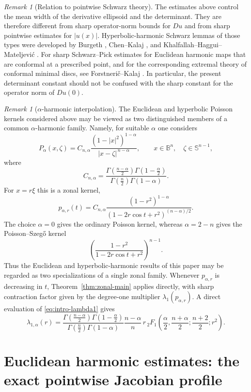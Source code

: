 \documentclass[11pt,reqno]{amsart}
\theoremstyle{remark}
\newtheorem{remark}[theorem]{Remark}
\begin{document}
\begin{remark}[Relation to pointwise Schwarz theory]
The estimates above control the mean width of the derivative ellipsoid
and the determinant. They are therefore different from sharp operator-norm bounds for $Du$ and from sharp pointwise estimates for $|u(x)|$. Hyperbolic-harmonic Schwarz lemmas of those types were developed by Burgeth \cite{Burgeth1992}, Chen--Kalaj \cite{ChenKalaj2021}, and Khalfallah--Haggui--Mateljevi\'c \cite{KhalfallahHagguiMateljevic2022}. For sharp Schwarz--Pick estimates for Euclidean harmonic maps that are conformal at a prescribed point, and for the corresponding extremal theory of conformal minimal discs, see Forstneri\v{c}--Kalaj \cite{ForstnericKalaj2024}. In particular, the present determinant constant should not be confused with the sharp constant for the operator norm of $Du(0)$.
\end{remark}
\begin{remark}[$\alpha$-harmonic interpolation]
The Euclidean and hyperbolic Poisson kernels considered above may be viewed
as two distinguished members of a common $\alpha$-harmonic family.  Namely,
for suitable $\alpha$ one considers
\[
 P_{\alpha}(x,\zeta)
 =
 C_{n,\alpha}
 \frac{(1-|x|^2)^{1-\alpha}}
 {|x-\zeta|^{\,n-\alpha}},
 \qquad
 x\in\mathbb B^n,\quad
 \zeta\in\mathbb S^{n-1},
\]
where
\[
 C_{n,\alpha}
 =
 \frac{
 \Gamma\!\left(\frac{n-\alpha}{2}\right)
 \Gamma\!\left(1-\frac{\alpha}{2}\right)}
 {\Gamma\!\left(\frac n2\right)\Gamma(1-\alpha)}.
\]
For $x=r\xi$ this is a zonal kernel,
\[
 p_{\alpha,r}(t)
 =
 C_{n,\alpha}
 \frac{(1-r^2)^{1-\alpha}}
 {(1-2r\cos t+r^2)^{(n-\alpha)/2}}.
\]
The choice $\alpha=0$ gives the ordinary Poisson kernel,
whereas $\alpha=2-n$ gives the Poisson--Szeg\H{o} kernel
\[
 \left(
 \frac{1-r^2}{1-2r\cos t+r^2}
 \right)^{n-1}.
\]
Thus the Euclidean and hyperbolic-harmonic results of this paper may be
regarded as two specializations of a single zonal family.  Whenever
$p_{\alpha,r}$ is decreasing in $t$, Theorem~\ref{thm:zonal-main} applies
directly, with sharp contraction factor given by the degree-one multiplier
$\lambda_1(p_{\alpha,r})$. A direct evaluation of \eqref{eq:intro-lambda1} gives \[
\lambda_{1,\alpha}(r)
=
\frac{
\Gamma\!\left(\frac{n-\alpha}{2}\right)
\Gamma\!\left(1-\frac{\alpha}{2}\right)}
{\Gamma\!\left(\frac n2\right)\Gamma(1-\alpha)}
\frac{n-\alpha}{n}\,
r\,
{}_2F_1\!\left(
\frac{\alpha}{2},
\frac{n+\alpha}{2};
\frac{n+2}{2};
r^2
\right).
\]
\end{remark}
\section{Euclidean harmonic estimates: the exact pointwise Jacobian profile}
\label{local:sec:euclidean-jacobian}
\end{document}
